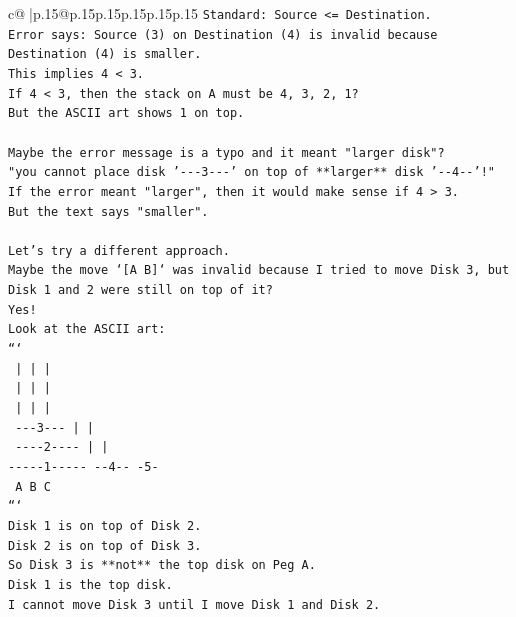 \documentclass{article}
\begin{document}
{\begin{supertabular}{c@{$\;$}|p{.15\linewidth}@{}p{.15\linewidth}p{.15\linewidth}p{.15\linewidth}p{.15\linewidth}p{.15\linewidth}}
{{{\texttt{Standard: Source <= Destination.} \\
\texttt{Error says: Source (3) on Destination (4) is invalid because Destination (4) is smaller.} \\
\texttt{This implies 4 < 3.} \\
\texttt{If 4 < 3, then the stack on A must be 4, 3, 2, 1?} \\
\texttt{But the ASCII art shows 1 on top.} \\
\\ 
\texttt{Maybe the error message is a typo and it meant "larger disk"?} \\
\texttt{"you cannot place disk '{-}{-}{-}3{-}{-}{-}' on top of **larger** disk '{-}{-}4{-}{-}'!"} \\
\texttt{If the error meant "larger", then it would make sense if 4 > 3.} \\
\texttt{But the text says "smaller".} \\
\\ 
\texttt{Let's try a different approach.} \\
\texttt{Maybe the move `{[}A B{]}` was invalid because I tried to move Disk 3, but Disk 1 and 2 were still on top of it?} \\
\texttt{Yes!} \\
\texttt{Look at the ASCII art:} \\
\texttt{```} \\
\texttt{     |           |           |     } \\
\texttt{     |           |           |     } \\
\texttt{     |           |           |     } \\
\texttt{  {-}{-}{-}3{-}{-}{-}        |           |     } \\
\texttt{ {-}{-}{-}{-}2{-}{-}{-}{-}       |           |     } \\
\texttt{{-}{-}{-}{-}{-}1{-}{-}{-}{-}{-}    {-}{-}4{-}{-}        {-}5{-}    } \\
\texttt{     A           B           C     } \\
\texttt{```} \\
\texttt{Disk 1 is on top of Disk 2.} \\
\texttt{Disk 2 is on top of Disk 3.} \\
\texttt{So Disk 3 is **not** the top disk on Peg A.} \\
\texttt{Disk 1 is the top disk.} \\
\texttt{I cannot move Disk 3 until I move Disk 1 and Disk 2.} \\
}}}
\end{supertabular}}
\end{document}
